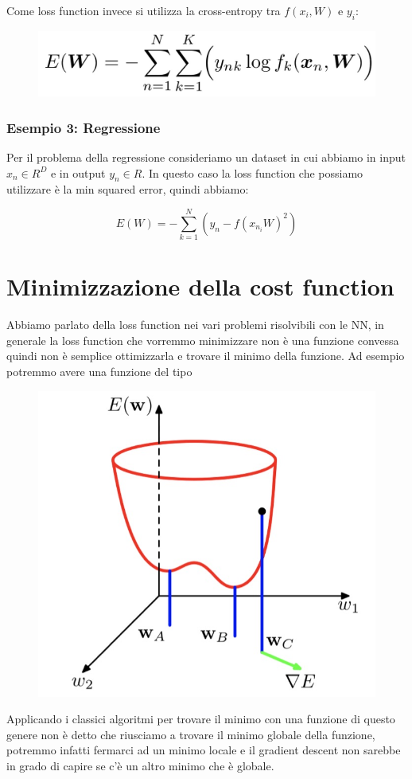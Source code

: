 \documentclass[14pt]{extreport}
\begin{document}
Come loss function invece si utilizza la cross-entropy tra $f(x_i, W)$ e $y_i$:
\begin{figure}[H]
	\centering
	\includegraphics[width=0.5\linewidth]{376.jpeg}
\end{figure}

\subsubsection{Esempio 3: Regressione}

Per il problema della regressione consideriamo un dataset in cui abbiamo in input $x_n \in R^D$ e in output $y_n \in R$. In questo caso la loss
function che possiamo utilizzare è la min squared error, quindi abbiamo:

$$E(W) = -\sum_{k=1}^N(y_n-f(x_{n_{i}} W)^2)$$

\section{Minimizzazione della cost function}

Abbiamo parlato della loss function nei vari problemi risolvibili con le NN, in generale la loss function che vorremmo minimizzare non è una funzione
convessa quindi non è semplice ottimizzarla e trovare il minimo della funzione. Ad esempio potremmo avere una funzione del tipo

\begin{figure}[H]
	\centering
	\includegraphics[width=0.4\linewidth]{377.jpeg}
\end{figure}

Applicando i classici algoritmi per trovare il minimo con una funzione di questo genere non è detto che riusciamo a trovare il minimo globale della
funzione, potremmo infatti fermarci ad un minimo locale e il gradient descent non sarebbe in grado di capire se c'è un altro minimo che è globale.
\end{document}
